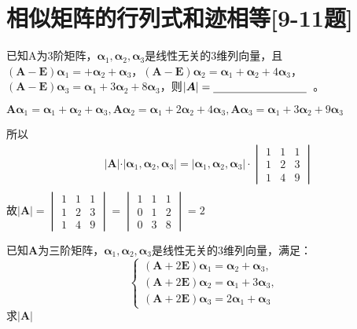 \section*{相似矩阵的行列式和迹相等[9-11题]}
\begin{question} 
    已知A为3阶矩阵，\(\bm{\alpha}_1,\bm{\alpha}_2,\bm{\alpha}_3\)是线性无关的3维列向量，且\((\mathbf{A - E})\bm{\alpha}_1= + \bm{\alpha}_2+\bm{\alpha}_3\)，\((\mathbf{A - E})\bm{\alpha}_2=\bm{\alpha}_1+\bm{\alpha}_2 + 4 \bm{\alpha}_3\)，\((\mathbf{A - E})\bm{\alpha}_3=\bm{\alpha}_1+3 \bm{\alpha}_2 + 8 \bm{\alpha}_3\)，则\(\vert \bm{A}\vert=\rule[-0.5ex]{3cm}{0.4pt}\) 。
\end{question}
\begin{solution}
    \(\bm{A}\bm{\alpha}_1=\bm{\alpha}_1 + \bm{\alpha}_2 +\bm{\alpha}_3 , \bm{A} \bm{\alpha}_2 = \bm{\alpha}_1 + 2 \bm{\alpha}_2
    +4 \bm{\alpha}_3, \bm{A}\bm{\alpha}_3 = \bm{\alpha}_1 + 3 \bm{\alpha}_2 + 9 \bm{\alpha}_3\) \vspace{5pt}\par
    所以\begin{align*}&\vert \bm{A} \vert \cdot \vert \bm{\alpha}_1, \bm{\alpha}_2, \bm{\alpha}_3 \vert = \vert \bm{\alpha}_1, \bm{\alpha}_2, \bm{\alpha}_3\vert \cdot \begin{vmatrix}
        1&1&1\\
        1&2&3\\
        1&4&9
    \end{vmatrix} \\
    \end{align*}
    故\(\vert \bm{A} \vert= \begin{vmatrix}
        1&1&1\\
        1&2&3\\
        1&4&9
    \end{vmatrix} = \begin{vmatrix}
        1&1&1\\
        0&1&2\\
        0&3&8
    \end{vmatrix} = 2\)
\end{solution}

\begin{question}
    已知$\bm{A}$为三阶矩阵，$\bm{\alpha}_1,\bm{\alpha}_2,\bm{\alpha}_3$是线性无关的3维列向量，满足：
    \begin{equation*}
        \begin{cases}  %
            (\bm{A}+2 \bm{E}) \bm{\alpha}_1 = \bm{\alpha}_2 + \bm{\alpha}_3, \\ 
            (\bm{A}+2 \bm{E}) \bm{\alpha}_2 = \bm{\alpha}_1 + 3 \bm{\alpha}_3, \\ 
            (\bm{A}+2 \bm{E}) \bm{\alpha}_3 = 2 \bm{\alpha}_1 + \bm{\alpha}_3 
        \end{cases} 
    \end{equation*}
    求$\vert\bm{A}\vert$ 
\end{question}

